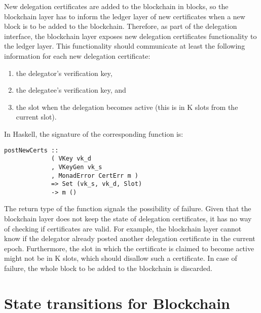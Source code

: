 \documentclass[11pt,a4paper]{article}
\begin{document}
New delegation certificates are added to the blockchain in blocks, so the
blockchain layer has to inform the ledger layer of new certificates when a new
block is to be added to the blockchain.
%
Therefore, as part of the delegation interface, the blockchain layer exposes
new delegation certificates functionality to the ledger layer.
%
This functionality should communicate at least the following information for
each new delegation certificate:
%
\begin{enumerate}
\item the delegator's verification key,
%
\item the delegatee's verification key, and
%
\item the slot when the delegation becomes active (this is in K slots from the
  current slot).
\end{enumerate}
%
In Haskell, the signature of the corresponding function is:
%
\begin{lstlisting}
postNewCerts ::
             ( VKey vk_d
             , VKeyGen vk_s
             , MonadError CertErr m )
             => Set (vk_s, vk_d, Slot)
             -> m ()
\end{lstlisting}
%
The return type of the function signals the possibility of failure.
%
Given that the blockchain layer does not keep the state of delegation
certificates, it has no way of checking if certificates are valid.
%
For example, the blockchain layer cannot know if the delegator already posted
another delegation certificate in the current epoch.
%
Furthermore, the slot in which the certificate is claimed to become active
might not be in K slots, which should disallow such a certificate.
%
In case of failure, the whole block to be added to the blockchain is
discarded.


\section{State transitions for Blockchain}
\label{sec:state-trans-chain}
\end{document}
